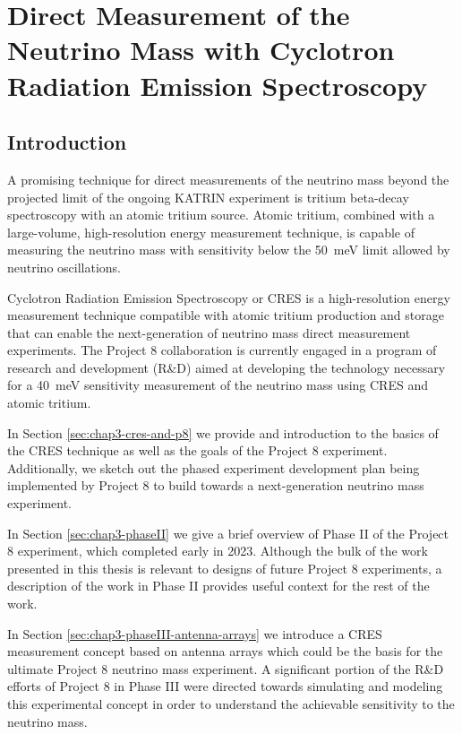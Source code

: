 
\chapter{Direct Measurement of the Neutrino Mass with Cyclotron Radiation Emission Spectroscopy}

\section{Introduction}

A promising technique for direct measurements of the neutrino mass beyond the projected limit of the ongoing KATRIN experiment is tritium beta-decay spectroscopy with an atomic tritium source. Atomic tritium, combined with a large-volume, high-resolution energy measurement technique, is capable of measuring the neutrino mass with sensitivity below the 50~meV limit allowed by neutrino oscillations. 

Cyclotron Radiation Emission Spectroscopy or CRES is a high-resolution energy measurement technique compatible with atomic tritium production and storage that can enable the next-generation of neutrino mass direct measurement experiments. The Project 8 collaboration is currently engaged in a program of research and development (R\&D) aimed at developing the technology necessary for a 40~meV sensitivity measurement of the neutrino mass using CRES and atomic tritium.

In Section \ref{sec:chap3-cres-and-p8} we provide and introduction to the basics of the CRES technique as well as the goals of the Project 8 experiment. Additionally, we sketch out the phased experiment development plan being implemented by Project 8 to build towards a next-generation neutrino mass experiment.

In Section \ref{sec:chap3-phaseII} we give a brief overview of Phase II of the Project 8 experiment, which completed early in 2023. Although the bulk of the work presented in this thesis is relevant to designs of future Project 8 experiments, a description of the work in Phase II provides useful context for the rest of the work.

In Section \ref{sec:chap3-phaseIII-antenna-arrays} we introduce a CRES measurement concept based on antenna arrays which could be the basis for the ultimate Project 8 neutrino mass experiment. A significant portion of the R\&D efforts of Project 8 in Phase III were directed towards simulating and modeling this experimental concept in order to understand the achievable sensitivity to the neutrino mass.

